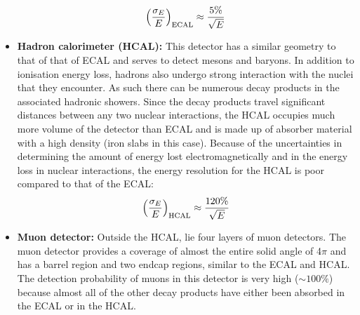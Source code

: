 \begin{itemize}
\begin{equation}
\left(\dfrac{\sigma_{E}}{E}\right)_{\rm{ECAL}}\approx \dfrac{5 \%}{\sqrt{E}}
\end{equation}
\item \textbf{Hadron calorimeter (HCAL):} This detector has a similar geometry to that of that of ECAL and serves to detect mesons and baryons. In addition to ionisation energy loss, hadrons also undergo strong interaction with the nuclei that they encounter. As such there can be numerous decay products in the associated hadronic showers. Since the decay products travel significant distances between any two nuclear interactions, the HCAL occupies much more volume of the detector than ECAL and is made up of absorber material with a high density (iron slabs in this case). Because of the uncertainties in determining the amount of energy lost electromagnetically and in the energy loss in nuclear interactions, the energy resolution for the HCAL is poor compared to that of the ECAL:
\begin{equation}
\left(\dfrac{\sigma_{E}}{E}\right)_{\rm{HCAL}}\approx \dfrac{120 \%}{\sqrt{E}}
\end{equation} 
\item \textbf{Muon detector:} Outside the HCAL, lie four layers of muon detectors. The muon detector provides a coverage of almost the entire solid angle of 4$\pi$ and has a barrel region and two endcap regions, similar to the ECAL and HCAL. The detection probability of muons in this detector is very high ($\sim 100 \%$) because almost all of the other decay products have either been absorbed in the ECAL or in the HCAL.
\end{itemize}
